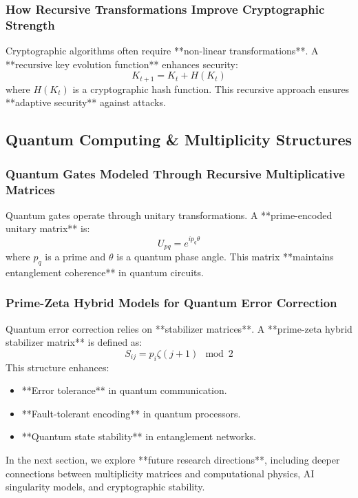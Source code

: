 \documentclass{article}
\theoremstyle{plain}
\begin{document}
\subsubsection{How Recursive Transformations Improve Cryptographic Strength}
Cryptographic algorithms often require **non-linear transformations**. A **recursive key evolution function** enhances security:
\begin{equation}
    K_{t+1} = K_t + H(K_t)
\end{equation}
where \( H(K_t) \) is a cryptographic hash function. This recursive approach ensures **adaptive security** against attacks.

\subsection{Quantum Computing \& Multiplicity Structures}

\subsubsection{Quantum Gates Modeled Through Recursive Multiplicative Matrices}
Quantum gates operate through unitary transformations. A **prime-encoded unitary matrix** is:
\begin{equation}
    U_{pq} = e^{i p_q \theta}
\end{equation}
where \( p_q \) is a prime and \( \theta \) is a quantum phase angle. This matrix **maintains entanglement coherence** in quantum circuits.

\subsubsection{Prime-Zeta Hybrid Models for Quantum Error Correction}
Quantum error correction relies on **stabilizer matrices**. A **prime-zeta hybrid stabilizer matrix** is defined as:
\begin{equation}
    S_{ij} = p_i \zeta(j+1) \mod 2
\end{equation}
This structure enhances:
\begin{itemize}
    \item **Error tolerance** in quantum communication.
    \item **Fault-tolerant encoding** in quantum processors.
    \item **Quantum state stability** in entanglement networks.
\end{itemize}

In the next section, we explore **future research directions**, including deeper connections between multiplicity matrices and computational physics, AI singularity models, and cryptographic stability.

\nocite{*}


\end{document}
